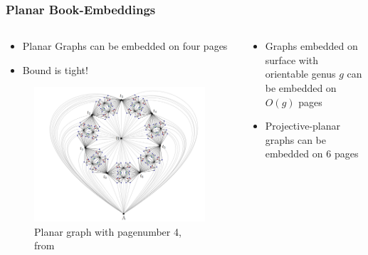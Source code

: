 \documentclass[english]{beamer}
\begin{document}
\begin{frame}
  \frametitle{Planar Book-Embeddings}
  \begin{columns}
    \begin{column}{0.5\textwidth}
        \begin{itemize}
          \item Planar Graphs can be embedded on four pages \cite{yannakakisEmbeddingPlanarGraphs1989}
          \item Bound is tight! \cite{yannakakisPlanarGraphsThat2020,bekosFourPagesAre2020}
        \end{itemize}    

        \begin{figure}
          \centering
          \includegraphics[width = \linewidth]{figures/Screenshot 2024-09-26 152422.png}
          \caption{Planar graph with pagenumber 4, from \cite{bekosFourPagesAre2020}}
        \end{figure}
    \end{column}
    \pause
      \begin{column}{0.5\textwidth}
      \begin{itemize}
        \item Graphs embedded on surface with orientable genus $g$ can be embedded on $O(g)$ pages \cite{heathPagenumberGenusGraphs1992}
        \item Projective-planar graphs can be embedded on 6 pages \cite{ozekiBookEmbeddingGraphs2019}
      \end{itemize}
      \end{column}
  \end{columns}
\end{frame}
\end{document}
